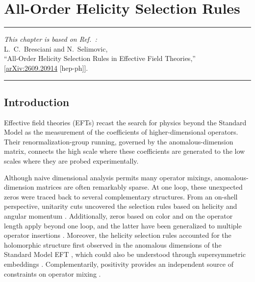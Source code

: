 \chapter{All-Order Helicity Selection Rules\label{ch:2looptheorems}}

\begin{flushright}
\small

{\color{chapterpaperrule}\rule{\textwidth}{0.5pt}}

\textit{This chapter is based on Ref.~\cite{Bresciani:2026yuw}:}\\[0.5em]
L.~C.~Bresciani and N.~Selimovic,\\[0pt]
``All-Order Helicity Selection Rules in Effective Field Theories,''\\[0pt]
[\href{https://doi.org/10.48550/arXiv.2609.20914}{arXiv:2609.20914} [hep-ph]].

{\color{chapterpaperrule}\rule{\textwidth}{0.5pt}}
\end{flushright}

\section{Introduction}

Effective field theories (EFTs) recast the search for physics beyond the Standard Model as the
measurement of the coefficients of higher-dimensional operators.
Their renormalization-group running, governed by the anomalous-dimension matrix, connects the high
scale where these coefficients are generated to the low scales where they are probed experimentally.

Although
naive dimensional analysis
permits many operator mixings, anomalous-di\-men\-sion matrices are often remarkably sparse.
At one loop, these unexpected zeros were traced back to several complementary structures.
From an on-shell perspective, unitarity cuts uncovered the selection rules based on helicity \cite{Cheung:2015aba} and angular momentum \cite{Jiang:2020rwz}.
Additionally, zeros based on color \cite{Bern:2020ikv} and on the operator length \cite{Bern:2019wie} apply beyond one loop, and the latter have been generalized to multiple operator insertions \cite{Cao:2023adc}.
Moreover, the helicity selection rules accounted for the holomorphic structure first observed in the anomalous dimensions of the Standard Model EFT \cite{Jenkins:2013zja,Jenkins:2013wua,Alonso:2013hga,Alonso:2014rga}, which could also be understood through supersymmetric embeddings \cite{Elias-Miro:2014eia}. Complementarily, positivity provides an independent source of constraints on operator mixing \cite{Chala:2023jyx,Chala:2023xjy,Liao:2025npz}.


